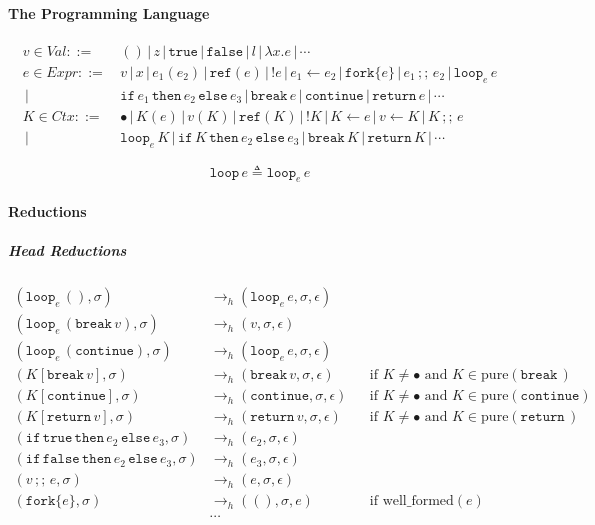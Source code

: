\documentclass{article}
\numberwithin{algorithm}{section}
\newcommand{\true}{\texttt{true}}
\newcommand{\false}{\texttt{false}}
\newcommand{\cref}{\texttt{ref}}
\newcommand{\cfork}[1]{\texttt{fork}\{#1\}}
\newcommand{\cloop}[1]{\texttt{loop}_{#1}\,}
\newcommand{\cbreak}{\texttt{break}\,}
\newcommand{\ccontinue}{\texttt{continue}}
\newcommand{\cif}{\texttt{if}\,}
\newcommand{\cthen}{\,\texttt{then}\,}
\newcommand{\celse}{\,\texttt{else}\,}
\newcommand{\cseq}{\,;;\,}
\newcommand{\creturn}{\texttt{return}\,}
\newcommand{\pure}[1]{\text{pure}(#1)}
\newcommand{\wellf}[1]{\text{well\_formed}(#1)}
\newcommand{\hred}{\rightarrow_h}
\newcommand{\sep}{\,|\,}
\begin{document}
\paragraph{The Programming Language}

$$
\begin{aligned}
    v \in \textit{Val} ::=\, & () \sep z \sep \true \sep \false \sep l \sep \lambda x.e \sep \cdots \\
    e \in \textit{Expr} ::=\, & v \sep x \sep e_1(e_2) \sep \cref(e) \sep !e \sep e_1 \leftarrow e_2 \sep \cfork{e} \sep e_1 \cseq e_2 \sep \cloop{e} e \\
                        \sep\, & \cif e_1 \cthen e_2 \celse e_3 \sep \cbreak e \sep \ccontinue \sep \creturn e \sep \cdots \\
    K \in \textit{Ctx} ::=\, & \bullet \sep K(e) \sep v(K) \sep \cref(K) \sep !K \sep K \leftarrow e \sep v \leftarrow K \sep K \cseq e \\
                        \sep\, & \cloop{e} K \sep \cif K \cthen e_2 \celse e_3 \sep \cbreak K \sep \creturn K \sep \cdots
\end{aligned}
$$

$$
\texttt{loop}\, e \triangleq \cloop{e} e
$$

\paragraph{Reductions}

\subparagraph{Head Reductions}

$$
\begin{aligned}
    (\cloop{e} (), \sigma) &\hred (\cloop{e} e, \sigma, \epsilon) && \\
    (\cloop{e} (\cbreak v), \sigma) &\hred (v, \sigma, \epsilon) && \\
    (\cloop{e} (\ccontinue), \sigma) &\hred (\cloop{e} e, \sigma, \epsilon) &&  \\
    (K[\cbreak v], \sigma) &\hred (\cbreak v, \sigma, \epsilon) && \text{if } K \neq \bullet \text{ and } K \in \pure{\cbreak\!} \\
    (K[\ccontinue], \sigma) &\hred (\ccontinue, \sigma, \epsilon) && \text{if } K \neq \bullet \text{ and } K \in \pure{\ccontinue} \\
    (K[\creturn v], \sigma) &\hred (\creturn v, \sigma, \epsilon) && \text{if } K \neq \bullet \text{ and } K \in \pure{\creturn\!} \\
    (\cif \true \cthen e_2 \celse e_3, \sigma) &\hred (e_2, \sigma, \epsilon) && \\
    (\cif \false \cthen e_2 \celse e_3, \sigma) &\hred (e_3, \sigma, \epsilon) && \\
    (v \cseq e, \sigma) &\hred (e, \sigma, \epsilon) && \\
    (\cfork{e}, \sigma) &\hred ((), \sigma, e) && \text{if } \wellf{e} \\
    &\cdots
\end{aligned}
$$
\end{document}
